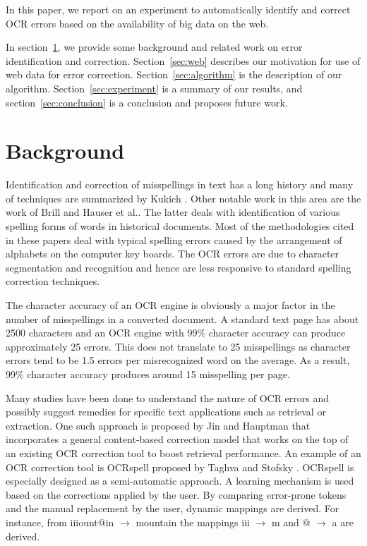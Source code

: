 \documentclass{article}
\begin{document}
In this paper, we report on an experiment to automatically identify
and correct OCR errors based on the availability of big data on the
web. 

In section~\ref{sec:background}, we provide some background and
related work on error identification and
correction. Section~\ref{sec:web} describes our motivation for use of
web data for error correction.  Section~\ref{sec:algorithm} is the
description of our algorithm. Section~\ref{sec:experiment} is a
summary of our results, and section~\ref{sec:conclusion} is a
conclusion and proposes future work.

\section{Background}
\label{sec:background}

Identification and correction of misspellings in text has a long
history and many of techniques are summarized by Kukich \cite{Kukich}.
Other notable work in this area are the work of Brill \cite{Brill} and
Hauser et al.\cite{Hauser}. The latter deals with identification of
various spelling forms of words in historical documents. Most of the
methodologies cited in these papers deal with typical spelling errors
caused by the arrangement of alphabets on the computer key boards. The
OCR errors are due to character segmentation and recognition and hence
are less responsive to standard spelling correction techniques.

The character accuracy of an OCR engine is obviously a major factor in
the number of misspellings in a converted document. A standard text
page has about 2500 characters and an OCR engine with 99\% character
accuracy can produce approximately 25 errors. This does not translate
to 25 misspellings as character errors tend to be 1.5 errors per
misrecognized word on the average. As a result, 99\% character
accuracy produces around 15 misspelling per page.

Many studies have been done to understand the nature of OCR errors and
possibly suggest remedies for specific text applications such as
retrieval or extraction. One such approach is proposed by Jin and
Hauptman \cite{Jin2003} that incorporates a general content-based
correction model that works on the top of an existing OCR correction
tool to boost retrieval performance. An example of an OCR correction tool
is OCRspell proposed by Taghva and Stofsky \cite{Taghva01}.  OCRspell
is especially designed as a semi-automatic approach.  A learning
mechanism is used based on the corrections applied by the user. By
comparing error-prone tokens and the manual replacement by the user,
dynamic mappings are derived. For instance, from iiiount@in $
\rightarrow $ mountain the mappings iii $ \rightarrow $ m and @ $
\rightarrow $ a are derived.
\end{document}
